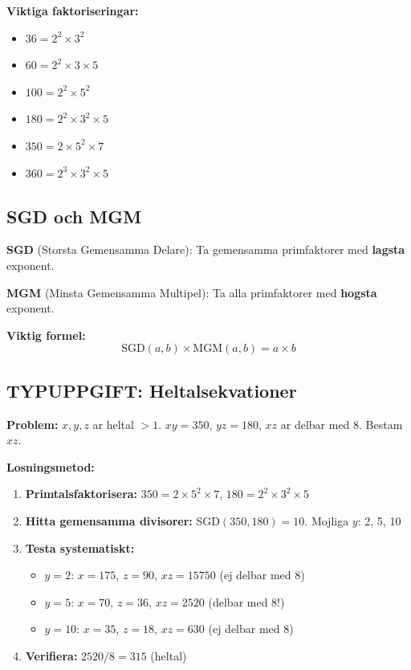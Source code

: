 \documentclass[11pt,a4paper]{article}
\newenvironment{formelbox}{\begin{framed}\color{mainblue}}{\end{framed}}
\begin{document}
\textbf{Viktiga faktoriseringar:}
\begin{itemize}
\item $36 = 2^2 \times 3^2$
\item $60 = 2^2 \times 3 \times 5$
\item $100 = 2^2 \times 5^2$
\item $180 = 2^2 \times 3^2 \times 5$
\item $350 = 2 \times 5^2 \times 7$
\item $360 = 2^3 \times 3^2 \times 5$
\end{itemize}

\subsection{SGD och MGM}

\textbf{SGD} (Storsta Gemensamma Delare): Ta gemensamma primfaktorer med \textbf{lagsta} exponent.

\textbf{MGM} (Minsta Gemensamma Multipel): Ta alla primfaktorer med \textbf{hogsta} exponent.

\begin{formelbox}
\textbf{Viktig formel:}
\[ \text{SGD}(a,b) \times \text{MGM}(a,b) = a \times b \]
\end{formelbox}

\subsection{TYPUPPGIFT: Heltalsekvationer}

\textbf{Problem:} $x, y, z$ ar heltal $> 1$. $xy = 350$, $yz = 180$, $xz$ ar delbar med 8. Bestam $xz$.

\textbf{Losningsmetod:}
\begin{enumerate}
\item \textbf{Primtalsfaktorisera:} $350 = 2 \times 5^2 \times 7$, $180 = 2^2 \times 3^2 \times 5$
\item \textbf{Hitta gemensamma divisorer:} SGD$(350, 180) = 10$. Mojliga $y$: 2, 5, 10
\item \textbf{Testa systematiskt:}
\begin{itemize}
\item $y = 2$: $x = 175$, $z = 90$, $xz = 15750$ (ej delbar med 8)
\item $y = 5$: $x = 70$, $z = 36$, $xz = 2520$ (delbar med 8!)
\item $y = 10$: $x = 35$, $z = 18$, $xz = 630$ (ej delbar med 8)
\end{itemize}
\item \textbf{Verifiera:} $2520 / 8 = 315$ (heltal)
\end{enumerate}
\end{document}
